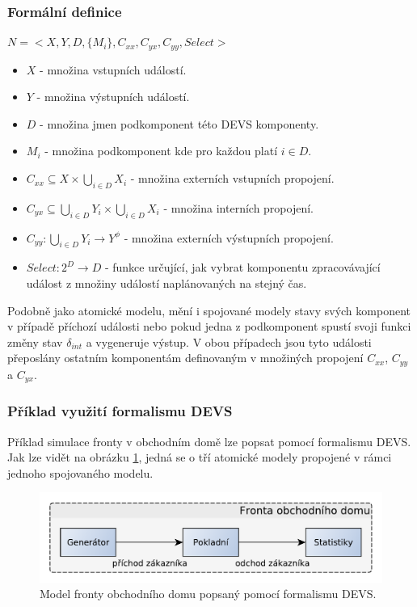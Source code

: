 \subsubsection{Formální definice}

\begin{math}
N=<X,Y,D,\{M_i\},C_{xx}, C_{yx}, C_{yy}, Select>
\end{math}

\begin{itemize}
\item $X$ - množina vstupních událostí.
\item $Y$ - množina výstupních událostí.
\item $D$ - množina jmen podkomponent této DEVS komponenty.
\item $M_i$ - množina podkomponent kde pro každou platí $i \in D$.
\item $C_{xx}\subseteq X \times \bigcup_{i \in D} X_i$ - množina externích vstupních propojení.
\item $C_{yx}\subseteq \bigcup_{i \in D} Y_i \times \bigcup_{i \in D} X_i$ - množina interních propojení.
\item $C_{yy}: \bigcup_{i \in D} Y_i \rightarrow Y^\phi$ - množina externích výstupních propojení.
\item $Select:2^D \rightarrow D$ - funkce určující, jak vybrat komponentu zpracovávající událost z množiny událostí naplánovaných na stejný čas.
\end{itemize}

Podobně jako atomické modelu, mění i spojované modely stavy svých komponent v případě příchozí události nebo pokud jedna z podkomponent spustí svoji funkci změny stav $\delta_{int}$ a vygeneruje výstup. V obou případech jsou tyto události přeposlány ostatním komponentám definovaným v množiných propojení $C_{xx}$, $C_{yy}$ a $C_{yx}$.

\subsubsection{Příklad využití formalismu DEVS}

Příklad simulace fronty v obchodním domě lze popsat pomocí formalismu DEVS. Jak lze vidět na obrázku \ref{fig:fronta}, jedná se o tří atomické modely propojené v rámci jednoho spojovaného modelu.

\begin{figure}[ht]
\centering
\includegraphics[trim=0cm 0cm 0cm 0cm, scale=0.7]{fig/fronta}
\caption{Model fronty obchodního domu popsaný pomocí formalismu DEVS.}
\label{fig:fronta}
\end{figure}

